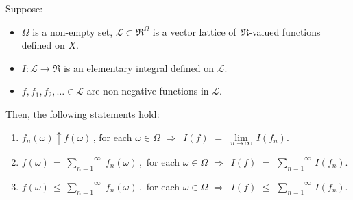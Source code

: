 \begin{lemma}
\mbox{}\vskip 0.1cm
\noindent
Suppose:
\begin{itemize}
\item
	$\Omega$ is a non-empty set,
	$\mathcal{L} \subset \Re^{\Omega}$ is a vector lattice of \,$\Re$-valued functions defined on $X$.
\item
	$I : \mathcal{L} \longrightarrow \Re$ is an elementary integral defined on $\mathcal{L}$.
\item
	$f, f_{1}, f_{2}, \ldots \in \mathcal{L}$ are non-negative functions in $\mathcal{L}$.
\end{itemize}
Then, the following statements hold:
\begin{enumerate}
\item
	$f_{n}(\omega) \uparrow f(\omega)$\,, for each $\omega\in\Omega$
	\;\;$\Longrightarrow$\;\,
	$I(f)$ $=$ $\underset{n\rightarrow\infty}{\lim}\,I(f_{n})$.
\item
	$f(\omega) \,=\, \overset{\infty}{\underset{n=1}{\sum}}\;f_{n}(\omega)$\,,\,
	for each $\omega\in\Omega$
	\;\;$\Longrightarrow$\;\,
	$I(f)$ $=$ $\overset{\infty}{\underset{n=1}{\sum}}\,I(f_{n})$.
\item
	$f(\omega) \,\leq\, \overset{\infty}{\underset{n=1}{\sum}}\;f_{n}(\omega)$\,,\,
	for each $\omega\in\Omega$
	\;\;$\Longrightarrow$\;\,
	$I(f)$ $\leq$ $\overset{\infty}{\underset{n=1}{\sum}}\,I(f_{n})$.
\end{enumerate}
\end{lemma}
\proof
